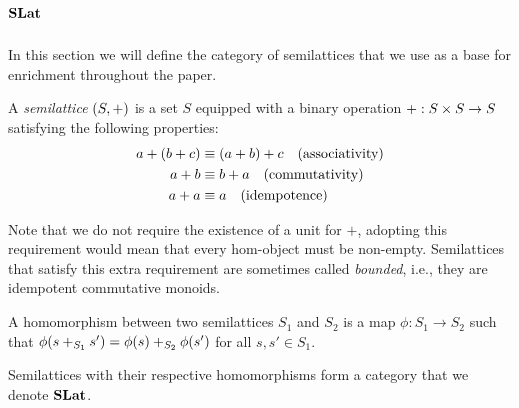 \section{$\mathbf{SLat}$}
\label{sec:appendix:slat}

In this section we will define the category of semilattices that we use as a base for enrichment throughout the paper.

\begin{definition}[Semilattice]
	A \textit{semilattice} $(S,+)$ is a set $S$ equipped with a binary operation $+ : S \times S \to S$ satisfying the following properties:
    \begin{align*}
        a + (b + c) &\equiv (a + b) + c \quad \text{(associativity)}\\
        a + b &\equiv b + a \quad \text{(commutativity)}\\
        a + a &\equiv a \quad \text{(idempotence)}
    \end{align*}
\end{definition}

Note that we do not require the existence of a unit for $+$, adopting this requirement would mean that every hom-object must be non-empty.
Semilattices that satisfy this extra requirement are sometimes called \textit{bounded}, i.e., they are idempotent commutative monoids.

\begin{definition}
	A homomorphism between two semilattices $S_{1}$ and $S_{2}$ is a map $\phi : S_1 \to S_2$ such that $\phi(s +_{S_{1}} s') = \phi(s) +_{S_{2}} \phi(s')$ for all $s,s' \in S_{1}$.
\end{definition}

\begin{definition}
	Semilattices with their respective homomorphisms form a category that we denote $\mathbf{SLat}$.
\end{definition}

